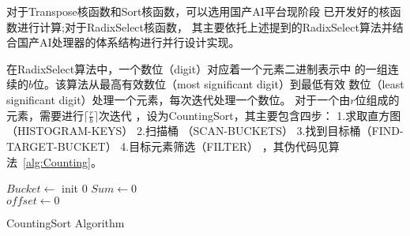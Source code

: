 对于Transpose核函数和Sort核函数，可以选用国产AI平台现阶段
已开发好的核函数进行计算;对于RadixSelect核函数，
其主要依托上述提到的RadixSelect算法并结合国产AI处理器的体系结构进行并行设计实现。

在RadixSelect算法中，一个数位（digit）对应着一个元素二进制表示中
的一组连续的\(b\)位。该算法从最高有效数位（most significant digit）到最低有效
数位（least significant digit）处理一个元素，每次迭代处理一个数位。
对于一个由\(r\)位组成的元素，需要进行\(\lceil\frac{r}{b}\rceil\)次迭代
，设为CountingSort，其主要包含四步：
1.求取直方图（HISTOGRAM-KEYS） 
2.扫描桶 （SCAN-BUCKETS） 
3.找到目标桶（FIND-TARGET-BUCKET） 
4.目标元素筛选（FILTER）
，其伪代码见算法~\ref{alg:Counting}。

\begin{algorithm}
    \SetAlgoNoLine 
    \label{alg:Counting}
    $Bucket \leftarrow$ init $0$ 
    $Sum \leftarrow 0$\;\\
    $offset \leftarrow 0$\\
    \caption{CountingSort Algorithm}
\end{algorithm}


